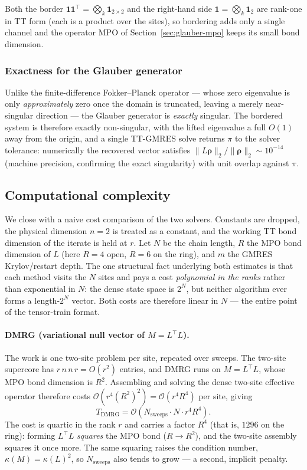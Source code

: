 \documentclass[12pt]{article}
\newcommand{\bigO}[1]{\mathcal{O}\left(#1\right)}
\newcommand{\brho}{\boldsymbol{\rho}}
\theoremstyle{definition}
\theoremstyle{remark}
\begin{document}
Both the border $\mathbf{1}\mathbf{1}^\top = \bigotimes_k \mathbf{1}_{2\times2}$ and the right-hand side $\mathbf{1} = \bigotimes_k \mathbf{1}_{2}$ are rank-one in TT form (each is a product over the sites), so bordering adds only a single channel and the operator MPO of Section~\ref{sec:glauber-mpo} keeps its small bond dimension.

\subsubsection*{Exactness for the Glauber generator}

Unlike the finite-difference Fokker--Planck operator --- whose zero eigenvalue is only \emph{approximately} zero once the domain is truncated, leaving a merely near-singular direction --- the Glauber generator is \emph{exactly} singular. The bordered system is therefore exactly non-singular, with the lifted eigenvalue a full $O(1)$ away from the origin, and a single TT-GMRES solve returns $\pi$ to the solver tolerance: numerically the recovered vector satisfies $\|L\brho\|_2/\|\brho\|_2 \sim 10^{-14}$ (machine precision, confirming the exact singularity) with unit overlap against $\pi$.

\subsection{Computational complexity}\label{sec:complexity}

We close with a naive cost comparison of the two solvers. Constants are dropped, the physical dimension $n = 2$ is treated as a constant, and the working TT bond dimension of the iterate is held at $r$. Let $N$ be the chain length, $R$ the MPO bond dimension of $L$ (here $R = 4$ open, $R = 6$ on the ring), and $m$ the GMRES Krylov/restart depth. The one structural fact underlying both estimates is that each method visits the $N$ sites and pays a cost \emph{polynomial in the ranks} rather than exponential in $N$: the dense state space is $2^N$, but neither algorithm ever forms a length-$2^N$ vector. Both costs are therefore linear in $N$ --- the entire point of the tensor-train format.

\paragraph{DMRG (variational null vector of $M = L^\top L$).}
The work is one two-site problem per site, repeated over sweeps. The two-site supercore has $r\,n\,n\,r = O(r^2)$ entries, and DMRG runs on $M = L^\top L$, whose MPO bond dimension is $R^2$. Assembling and solving the dense two-site effective operator therefore costs $\bigO{r^4 (R^2)^2} = \bigO{r^4 R^4}$ per site, giving
\[
T_{\mathrm{DMRG}} = \bigO{N_{\mathrm{sweeps}} \cdot N \cdot r^4 R^4}.
\]
The cost is quartic in the rank $r$ and carries a factor $R^4$ (that is, $1296$ on the ring): forming $L^\top L$ \emph{squares} the MPO bond ($R \to R^2$), and the two-site assembly squares it once more. The same squaring raises the condition number, $\kappa(M) = \kappa(L)^2$, so $N_{\mathrm{sweeps}}$ also tends to grow --- a second, implicit penalty.
\end{document}
